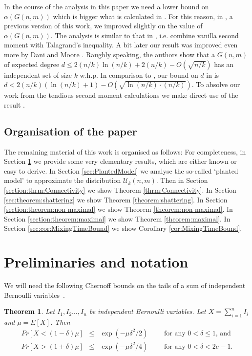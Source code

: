 \documentclass[a4paper,10pt]{article}
\newtheorem{theorem}{Theorem}\renewcommand{\thetheorem}{\arabic{theorem}}
\newcommand\cU{\mathcal{U}}
\begin{document}
In the course of the analysis in this paper we need a lower bound
on $\alpha(G(n,m))$ which is bigger what is calculated in \cite{frieze-is}.
For this reason, in \cite{arxivTR}, a previous version of this
work, we improved slightly on the value of $\alpha(G(n,m))$. The
analysis is similar to that in \cite{frieze-is}, i.e. combine
vanilla second moment with Talagrand's inequality. 
A bit later our result was improved even more by Dani and Moore
\cite{W2ndM}. Raughly speaking, the authors show that a $G(n,m)$
of expected degree $d\leq 2(n/k) \ln(n/k) + 2(n/k) -O(\sqrt{n/k})$
has an independent set of size $k$ w.h.p.
In comparison to \cite{W2ndM}, our bound on $d$ in \cite{arxivTR}
is $d<2(n/k)(\ln (n/k)+1)-O(\sqrt{\ln(n/k)\cdot (n/k)})$. To absolve
our work from the tendious second moment calculations we make direct
use of the result \cite{W2ndM}.




\subsection{Organisation of the paper}


The remaining material of this work is organised as follows:
For completeness, in Section \ref{sec:Prelim} we provide some 
very elementary results, which are either known  or easy to
derive. 
In Section \ref{sec:PlantedModel} we analyse the so-called `planted
model' to approximate the distribution $\cU_k(n,m)$. 
Then in Section \ref{section:thrm:Connectivity} we show Theorem
\ref{thrm:Connectivity}. In Section \ref{sec:theorem:shattering}
we show Theorem \ref{theorem:shattering}. In Section \ref{section:theorem:non-maximal}
we show Theorem \ref{theorem:non-maximal}. In Section
\ref{section:theorem:maximal} we show  Theorem \ref{theorem:maximal}.
In Section \ref{sec:cor:MixingTimeBound} we show Corollary \ref{cor:MixingTimeBound}.






\section{Preliminaries and notation}\label{sec:Prelim}


\noindent
We will need the following Chernoff bounds on the tails of a sum
of independent Bernoulli variables~\cite{MotwRandAlgBook}.

\begin{theorem}\label{chernoffbounds}
Let $I_1, I_2\ldots, I_n$ be independent Bernoulli variables.
Let $X=\sum_{i=1}^{n}I_i$ and $\mu=E[X]$.
Then
\begin{eqnarray}
Pr[X<(1-\delta)\mu]&\leq&\exp\left( -\mu\delta^2/2 \right)\qquad\mbox{ for any $0<\delta\leq 1$, and}\label{eq:ChernoffLB}\\
Pr[X>(1+\delta)\mu]&\leq&\exp\left( -\mu\delta^2/4 \right)\qquad\mbox{ for any $0<\delta<2e-1$}\label{eq:ChernoffUB}.
\end{eqnarray}
\end{theorem}
\end{document}
